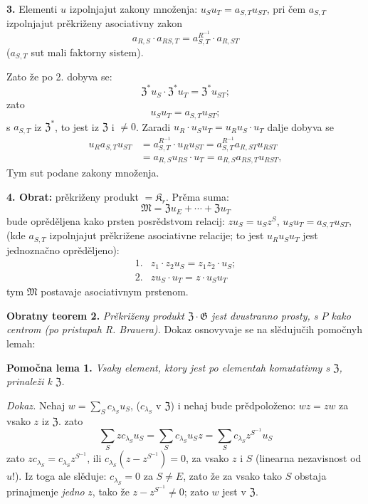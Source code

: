 \documentclass[11pt]{article}
\begin{document}
\noindent\textbf{3.} Elementi \(u\) izpolnjajut zakony množenja: \(u_Su_T=a_{S,T}u_{ST}\), pri čem \(a_{S,T}\) izpolnjajut prěkriženy asociativny zakon
\[
a_{R,S}\cdot a_{RS,T}=a_{S,T}^{R^{-1}}\cdot a_{R,ST}
\]
(\(a_{S,T}\) sut mali faktorny sistem).

Zato že po 2. dobyva se:
\[
\mathfrak Z^*u_S\cdot\mathfrak Z^*u_T=\mathfrak Z^*u_{ST};
\]
zato
\[
u_Su_T=a_{S,T}u_{ST};
\]
s \(a_{S,T}\) iz \(\mathfrak Z^*\), to jest iz \(\mathfrak Z\) i \(\neq0\). Zaradi \(u_R\cdot u_Su_T=u_Ru_S\cdot u_T\) dalje dobyva se
\[
\begin{aligned}
u_Ra_{S,T}u_{ST}
&=a_{S,T}^{R^{-1}}\cdot u_Ru_{ST}
 =a_{S,T}^{R^{-1}}a_{R,ST}u_{RST}\\
&=a_{R,S}u_{RS}\cdot u_T
 =a_{R,S}a_{RS,T}u_{RST},
\end{aligned}
\]
Tym sut podane zakony množenja.

\noindent\textbf{4. Obrat:} prěkriženy produkt \(=\mathfrak K_r\). Prěma suma:
\[
\mathfrak M=\mathfrak Zu_E+\cdots+\mathfrak Zu_T
\]
bude oprěděljena kako prsten posrědstvom relacij: \(zu_S=u_Sz^S\), \(u_Su_T=a_{S,T}u_{ST}\), (kde \(a_{S,T}\) izpolnjajut prěkrižene asociativne relacije; to jest \(u_Ru_Su_T\) jest jednoznačno oprěděljeno):
\[
\begin{array}{ll}
1.&z_1\cdot z_2u_S=z_1z_2\cdot u_S;\\[2pt]
2.&zu_S\cdot u_T=z\cdot u_Su_T
\end{array}
\]
tym \(\mathfrak M\) postavaje asociativnym prstenom.

\noindent\textbf{Obratny teorem 2.} \emph{Prěkriženy produkt \(\mathfrak Z\cdot\mathfrak G\) jest dvustranno prosty, s \(P\) kako centrom (po pristupah R. Brauera).} Dokaz osnovyvaje se na slědujučih pomočnyh lemah:

\noindent\textbf{Pomočna lema 1.} \emph{Vsaky element, ktory jest po elementah komutativny s \(\mathfrak Z\), prinaleži k \(\mathfrak Z\).}

\noindent\emph{Dokaz.} Nehaj \(w=\sum_S c_{\lambda_S}u_S\), (\(c_{\lambda_S}\) v \(\mathfrak Z\)) i nehaj bude prědpoloženo: \(wz=zw\) za vsako \(z\) iz \(\mathfrak Z\). zato
\[
\sum_S zc_{\lambda_S}u_S
 =\sum_S c_{\lambda_S}u_Sz
 =\sum_S c_{\lambda_S}z^{S^{-1}}u_S
\]
zato \(zc_{\lambda_S}=c_{\lambda_S}z^{S^{-1}}\), ili \(c_{\lambda_S}(z-z^{S^{-1}})=0\), za vsako \(z\) i \(S\) (linearna nezavisnost od \(u\)!). Iz toga ale slěduje: \(c_{\lambda_S}=0\) za \(S\neq E\), zato že za vsako tako \(S\) obstaja prinajmenje \emph{jedno} \(z\), tako že \(z-z^{S^{-1}}\neq0\); zato \(w\) jest v \(\mathfrak Z\).
\end{document}
